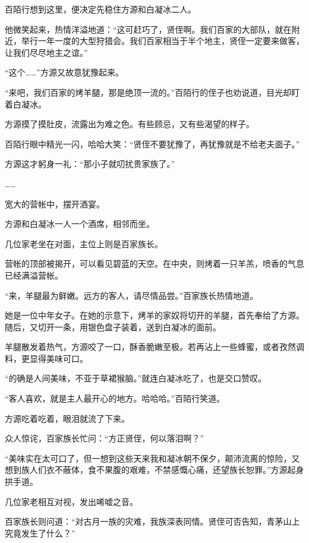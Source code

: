 \begin{this_body}
百陌行想到这里，便决定先稳住方源和白凝冰二人。

他微笑起来，热情洋溢地道：“这可赶巧了，贤侄啊。我们百家的大部队，就在附近，举行一年一度的大型狩猎会。我们百家相当于半个地主，贤侄一定要来做客，让我们尽尽地主之谊。”

“这个……”方源又故意犹豫起来。

“来吧，我们百家的烤羊腿，那是绝顶一流的。”百陌行的侄子也劝说道，目光却盯着白凝冰。

方源摸了摸肚皮，流露出为难之色。有些顾忌，又有些渴望的样子。

百陌行眼中精光一闪，哈哈大笑：“贤侄不要犹豫了，再犹豫就是不给老夫面子。”

方源这才躬身一礼：“那小子就叨扰贵家族了。”

……

宽大的营帐中，摆开酒宴。

方源和白凝冰一人一个酒席，相邻而坐。

几位家老坐在对面，主位上则是百家族长。

营帐的顶部被揭开，可以看见碧蓝的天空。在中央，则烤着一只羊羔，喷香的气息已经满溢营帐。

“来，羊腿最为鲜嫩。远方的客人，请尽情品尝。”百家族长热情地道。

她是一位中年女子。在她的示意下，烤羊的家奴将切开的羊腿，首先奉给了方源。随后，又切开一条，用银色盘子装着，送到白凝冰的面前。

羊腿散发着热气，方源咬了一口，酥香脆嫩至极。若再沾上一些蜂蜜，或者孜然调料，更显得美味可口。

“的确是人间美味，不亚于草裙猴脑。”就连白凝冰吃了，也是交口赞叹。

“客人喜欢，就是主人最开心的地方。哈哈哈。”百陌行笑道。

方源吃着吃着，眼泪就流了下来。

众人惊诧，百家族长忙问：“方正贤侄，何以落泪啊？”

“美味实在太可口了，但一想到这些天来我和凝冰朝不保夕，颠沛流离的惊险，又想到族人们衣不蔽体，食不果腹的艰难，不禁感慨心痛，还望族长恕罪。”方源起身拱手道。

几位家老相互对视，发出唏嘘之音。

百家族长则问道：“对古月一族的灾难，我族深表同情。贤侄可否告知，青茅山上究竟发生了什么？”

\end{this_body}

